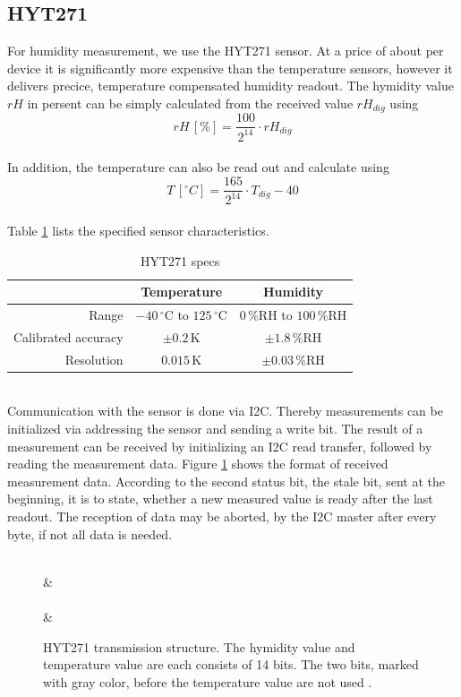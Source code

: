 \documentclass[a4paper]{scrreprt}
\begin{document}
\subsection{HYT271}
For humidity measurement, we use the HYT271 sensor. At a price of about  per device it is significantly more expensive than the temperature sensors, however it delivers precice, temperature compensated humidity readout. 
The hymidity value $rH$ in persent can be simply calculated from the received value $rH_{dig}$ using
$$rH\,[\%] = \frac{100}{2^{14}} \cdot  rH_{dig}$$\\
In addition, the temperature can also be read out and calculate using 
$$T\,[^{\circ} C] = \frac{165}{2^{14}} \cdot  T_{dig} - 40$$\\
Table \ref{tab:hyt} lists the specified sensor characteristics.
\begin{table}[Hh!]
	\centering
	\begin{tabular}{| r | c | c |}
		\hline
    &Temperature & Humidity\\
		\hline
		\hline
    Range & $-40\,^{\circ}\mathrm{C}$ to $125\,^{\circ}\mathrm{C}$ & $0\, \mathrm {\%RH}$ to $100\, \mathrm {\%RH}$\\
		\hline
    Calibrated accuracy & $\pm 0.2\,\mathrm{K}$ & $\pm 1.8\, \mathrm {\%RH}$   \\
		\hline
    Resolution & $0.015\,\mathrm{K}$ & $\pm 0.03\, \mathrm {\%RH}$ \\
		\hline
	\end{tabular}
  \caption{HYT271 specs \cite{hyt}}
	\label{tab:hyt}
\end{table}\\
Communication with the sensor is done via I2C. Thereby measurements can be initialized via addressing the sensor and sending a write bit. The result of a measurement can be received by initializing an I2C read transfer, followed by reading the measurement data. Figure \ref{fig:hyt_transmission} shows the format of received measurement data. According to the second status bit, the stale bit, sent at the beginning, it is to state, whether a new measured value is ready after the last readout. The reception of data may be aborted, by the I2C master after every byte, if not all data is needed.
\begin{figure}[Hh!]
	\centering
	\begin{bytefield}[endianness=big, bitwidth=2.1em]{8}
		\\
     & \\
    \\
     & \\
	\end{bytefield}
  \caption{HYT271 transmission structure. The hymidity value and temperature value are each consists of 14 bits. The two bits, marked with gray color, before the temperature value are not used \cite{hyt2}.}
	\label{fig:hyt_transmission}
\end{figure}\\
\end{document}
